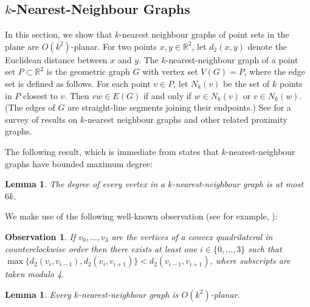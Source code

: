 \documentclass{patmorin}
\theoremstyle{plain}
\newtheorem{lem}[thm]{Lemma}
\newtheorem{obs}[thm]{Observation}
\theoremstyle{definition}
\newcommand{\R}{\mathbb{R}}
\begin{document}
\subsection{$k$-Nearest-Neighbour Graphs}
\label{last_example}

In this section, we show that $k$-nearest neighbour graphs of point sets in the plane are $O(k^2)$-planar.  For two points $x,y\in\R^2$, let $d_2(x,y)$ denote the Euclidean distance between $x$ and $y$. The $k$-nearest-neighbour graph of a point set $P\subset\R^2$ is the geometric graph $G$ with vertex set $V(G)=P$, where the edge set is defined as follows. For each point $v\in P$, let $N_k(v)$ be the set of $k$ points in $P$ closest to $v$. Then $vw\in E(G)$ if and only if $w\in N_k(v)$ or $v\in N_k(w)$. (The edges of $G$ are straight-line segments joining their endpoints.) See \citep{ProximityGraphs} for a survey of results on $k$-nearest neighbour graphs and other related proximity graphs.

The following result, which is immediate from \citet[Corollary~4.2.6]{abrego.munroy.ea:on} states that $k$-nearest-neighbour graphs have bounded maximum degree:
\begin{lem}
\label{k-nn-max-degree}
The degree of every vertex in a $k$-nearest-neighbour graph is at most $6k$.
\end{lem}

We make use of the following well-known observation (see for example, \citet[Lemma~2]{bose.morin.ea:routing}):
\begin{obs}
\label{convex}
If $v_0,\ldots,v_3$ are the vertices of a convex quadrilateral in counterclockwise order then there exists at least one $i\in\{0,\ldots,3\}$ such that $\max\{d_2(v_i,v_{i-1}), d_2(v_i,v_{i+1})\} < d_2(v_{i-1},v_{i+1})$, where subscripts are taken modulo 4.
\end{obs}

\begin{lem}
\label{nearest-neighbour}
  Every $k$-nearest-neighbour graph is $O(k^2)$-planar.
\end{lem}
\end{document}
